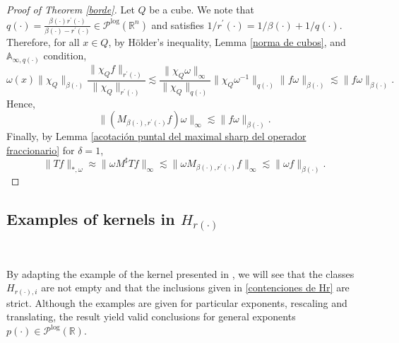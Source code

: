 \documentclass[a4paper,11pt,reqno]{amsart}
\theoremstyle{plain}
\numberwithin{equation}{section}
\theoremstyle{definition}
\newcommand{\R}{{\mathbb{R}^n}}
\begin{document}
\begin{proof}[Proof of Theorem \ref{borde}]
	Let $Q$ be a cube. We note that ${q(\cdot)}=\frac{\beta(\cdot)r^\prime(\cdot)}{{\beta(\cdot)}-{r^\prime(\cdot)}}\in\mathcal{P}^{\text{log}}(\R)$ and satisfies $1/r^\prime(\cdot)=1/\beta(\cdot)+1/q(\cdot)$. Therefore, for all $x\in Q$, by Hölder's inequality, Lemma \ref{norma de cubos}, and $\mathbb{A}_{\infty,q(\cdot)}$ condition,
	\begin{equation*}
		\omega(x) \|\chi_Q\|_{\beta(\cdot)}\frac{\|\chi_Q f\|_{r^\prime(\cdot)}}{\|\chi_Q\|_{r^\prime(\cdot)}}\lesssim  \frac{\|\chi_Q \omega\|_\infty}{\|\chi_Q\|_{q(\cdot)}}\|\chi_Q\omega^{-1}\|_{q(\cdot)}\|f\omega\|_{\beta(\cdot)}\lesssim \|f\omega\|_{\beta(\cdot)}.
	\end{equation*}
	Hence,
	\begin{equation*}
	\| (M_{{\beta(\cdot)},{r^\prime(\cdot)}}f)\omega\|_\infty\lesssim\|f\omega\|_{\beta(\cdot)}.
	\end{equation*}
	Finally, by Lemma \ref{acotación puntal del maximal sharp del operador fraccionario} for $\delta=1$,
	\begin{equation*}
	\|Tf\|_{*,\omega}\approx \|\omega M^\sharp Tf\|_\infty\lesssim \|\omega M_{{\beta(\cdot)},{r^\prime(\cdot)}}f\|_\infty\lesssim\|\omega f\|_{\beta(\cdot)}.
	\end{equation*}
	
\end{proof}


\subsection{Examples of kernels in $H_{r(\cdot)}$}

\

By adapting the example of the kernel presented in \cite{Hr es sharp}, we will see that the classes $H_{r(\cdot),i}$ are not empty and that the inclusions given in \eqref{contenciones de Hr} are strict. Although the examples are given for particular exponents, rescaling and translating, the result yield valid conclusions for general exponents $p(\cdot)\in\mathcal{P}^{\text{log}}(\mathbb{R})$. 
\end{document}
